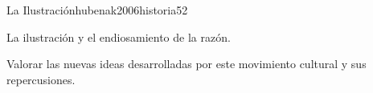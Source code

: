 \begin{syllabus}
\begin{unit}{La Ilustración}{hubenak2006historia}{5}{2}
\begin{topics}
	\item La ilustración y el endiosamiento de la razón.
\end{topics}
\begin{learningoutcomes}
	\item Valorar las nuevas ideas desarrolladas por este movimiento cultural y sus repercusiones.
\end{learningoutcomes}
\end{unit}



\begin{coursebibliography}
\end{coursebibliography}

\end{syllabus}
